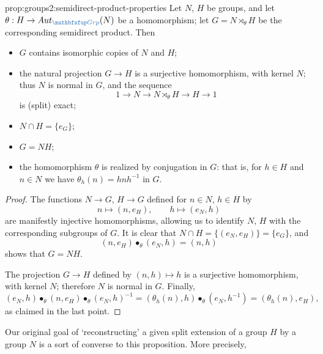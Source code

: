 \begin{prop}{}{prop:groups2:semidirect-product-properties}
  Let $N$, $H$ be groups, and let
  $\theta : H \to \Aut_{\categ{Grp}}(N)$ be a homomorphism; let
  $G = N \rtimes_\theta H$ be the corresponding semidirect
  product. Then
  \begin{itemize}
  \item $G$ contains isomorphic copies of $N$ and $H$;
  \item the natural projection $G \to H$ is a surjective homomorphism,
    with kernel $N$; thus $N$ is normal in $G$, and the sequence
    \[1 \longrightarrow N \longrightarrow N \rtimes_\theta H
      \longrightarrow H \longrightarrow 1\] is (split) exact;
  \item $N \cap H = \{e_G\}$;
  \item $G = NH$;
  \item the homomorphism $\theta$ is realized by conjugation in $G$:
    that is, for $h \in H$ and $n \in N$ we have
    $\theta_h(n) = hnh^{-1}$ in $G$.
  \end{itemize}
\end{prop}
\begin{proof}
  The functions $N \to G$, $H \to G$ defined for $n \in N$, $h \in H$
  by
  \[n \mapsto (n, e_H), \qquad h \mapsto (e_N, h)\] are manifestly
  injective homomorphisms, allowing us to identify $N$, $H$ with the
  corresponding subgroups of $G$. It is clear that
  $N \cap H = \{(e_N, e_H)\} = \{e_G\}$, and
  \[(n, e_H) \bullet_\theta (e_N, h) = (n, h)\] shows that $G = NH$.

  The projection $G \to H$ defined by $(n, h) \mapsto h$ is a
  surjective homomorphism, with kernel $N$; therefore $N$ is normal in
  $G$. Finally,
  \[(e_N, h) \bullet_\theta (n, e_H) \bullet_\theta (e_N, h)^{-1} =
    (\theta_h(n), h) \bullet_\theta (e_N, h^{-1}) = (\theta_h(n),
    e_H),\] as claimed in the last point.
\end{proof}
Our original goal of `reconstructing' a given split extension of a
group $H$ by a group $N$ is a sort of converse to this proposition.
More precisely,

